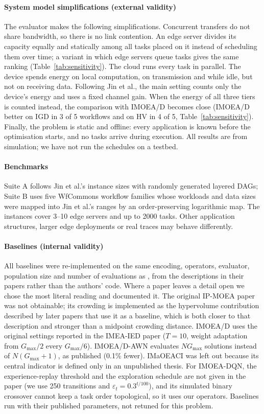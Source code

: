 \paragraph{System model simplifications (external validity)}
The evaluator makes the following simplifications. Concurrent transfers do not share bandwidth, so there is no link
contention. An edge server divides its capacity equally and statically among all tasks placed on it instead of
scheduling them over time; a variant in which edge servers queue tasks gives the same ranking
(Table~\ref{tab:sensitivity}). The cloud runs every task in parallel. The device spends energy on local computation,
on transmission and while idle, but not on receiving data. Following Jin et al., the main setting counts only the
device's energy and uses a fixed channel gain. When the energy of all three tiers is counted instead, the comparison
with IMOEA/D becomes close (IMOEA/D better on IGD in 3 of 5 workflows and on HV in 4 of 5,
Table~\ref{tab:sensitivity}). Finally, the problem is static and offline: every application is known before the
optimisation starts, and no tasks arrive during execution. All results are from simulation; we have not run the
schedules on a testbed.

\paragraph{Benchmarks}
Suite A follows Jin et al.'s instance sizes with randomly generated layered DAGs; Suite B uses five WfCommons
workflow families whose workloads and data sizes were mapped into Jin et al.'s ranges by an order-preserving
logarithmic map. The instances cover 3--10 edge servers and up to 2000 tasks. Other application structures, larger
edge deployments or real traces may behave differently.

\paragraph{Baselines (internal validity)}
All baselines were re-implemented on the same encoding, operators, evaluator, population size and number of
evaluations as \ours{}, from the descriptions in their papers rather than the authors' code. Where a paper leaves a detail open
we chose the most literal reading and documented it. The original IP-MOEA paper was not obtainable; its crowding is
implemented as the hypervolume contribution described by later papers that use it as a baseline, which is both closer
to that description and stronger than a midpoint crowding distance. IMOEA/D uses the original settings reported in
the IMEA-IED paper ($T = 10$, weight adaptation from $G_{\max}/2$ every $G_{\max}/6$). IMOEA/D-AWN evaluates
$NG_{\max}$ solutions instead of $N(G_{\max} + 1)$, as published (0.1\% fewer). IMaOEACI was left out because its
central indicator is defined only in an unpublished thesis. For IMOEA-DQN, the experience-replay threshold and the
exploration schedule are not given in the paper (we use 250 transitions and $\varepsilon_t = 0.3^{t/100}$), and its
simulated binary crossover cannot keep a task order topological, so it uses our operators. Baselines run with their
published parameters, not retuned for this problem.

